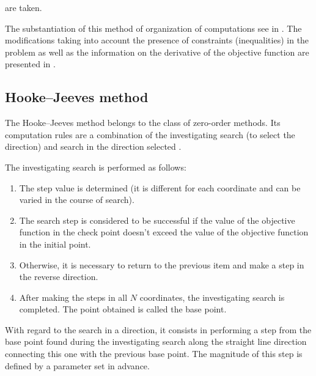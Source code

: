 \documentclass{svproc}
\begin{document}
are taken. 

The substantiation of this method of organization of computations see in \cite{fio_bib20}. The  modifications taking into account the presence of  constraints (inequalities) in the problem as well as  the information on the derivative of the objective function  are presented in \cite{fio_bib12, fio_bib9,  fio_bib11}.



\subsection{Hooke--Jeeves method}\label{SecHG}

The Hooke--Jeeves method belongs to the class of zero-order methods. Its computation rules are a  combination of the investigating search (to select the direction) and search in the direction selected  \cite{fio_bib14, fio_bib15}.

The investigating search is performed as follows:  \begin{enumerate} \item	The step value is determined (it is different for each coordinate and can be varied in the course  of search).  \item	The search step is considered to be successful if the value of the objective function in the check  point doesn't exceed the value of the objective function in the initial point.  \item	Otherwise, it is necessary to return to the previous item and make a step in the reverse direction.  \item	After making the steps in all $N$ coordinates, the investigating search is completed. The point  obtained is called the base point. \end{enumerate}

With regard to the search in a direction, it consists in performing a step from the base point found  during the investigating search along the straight line direction connecting this one with the previous  base point. The magnitude of this step is defined by a parameter set in advance.
\end{document}
